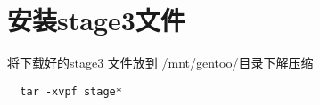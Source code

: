 \chapter{安装stage3文件}

将下载好的stage3 文件放到 /mnt/gentoo/目录下解压缩

\begin{lstlisting}
  tar -xvpf stage*
\end{lstlisting}
